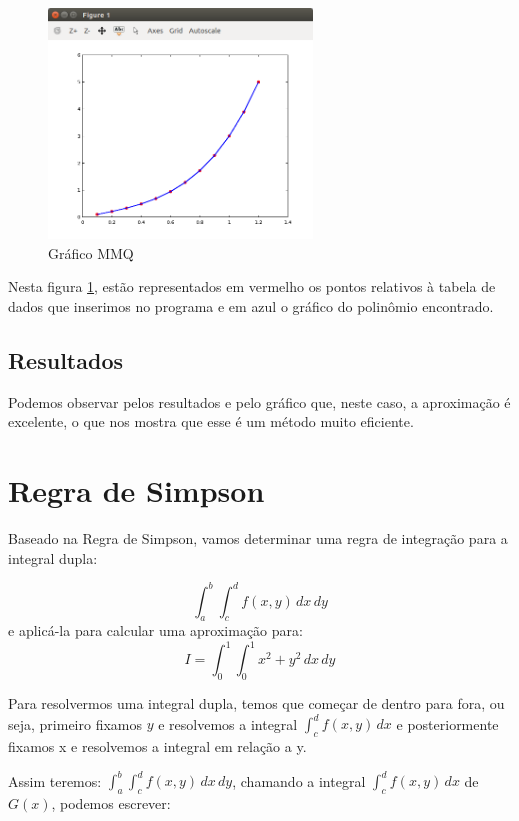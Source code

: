 \documentclass[11pt, openright, a4paper, brazil, openany, oneside]{abntex2}
\begin{document}
\begin{figure}[ht]

    \center

    \includegraphics[width=7cm]{grafico1.png}
    \caption{Gráfico MMQ \label{grafico1}}
    
\end{figure}

Nesta figura \ref{grafico1}, estão representados em vermelho os pontos relativos à tabela de dados que inserimos no programa e em azul o gráfico do polinômio encontrado.


\section{Resultados}

Podemos observar pelos resultados e pelo gráfico que, neste caso, a aproximação é excelente, o que nos mostra que esse é um método muito eficiente.


\chapter{Regra de Simpson}



Baseado na Regra de Simpson, vamos determinar uma regra de integração para a integral dupla:

$$\int_a^b\int_c^d f(x,y)\, dx\, dy$$
e aplicá-la para calcular uma aproximação para:
$$I=\int_0^1\int_0^1 x^2 + y^2\, dx\, dy$$

Para resolvermos uma integral dupla, temos que começar de dentro para fora, ou seja, primeiro fixamos $y$ e resolvemos a integral $\displaystyle\int_c^d f(x,y)\, dx$ e posteriormente fixamos x e resolvemos a integral em relação a y. 

Assim teremos: $\displaystyle\int_a^b\int_c^d f(x,y)\, dx\, dy$, chamando a integral $\displaystyle\int_c^d f(x,y)\, dx $ de $G(x)$, podemos escrever:
\end{document}
